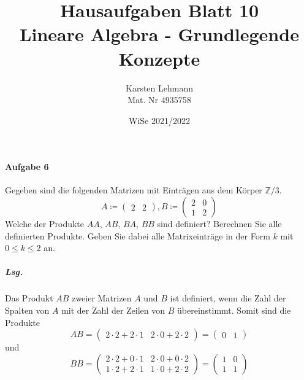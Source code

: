 \documentclass{scrreprt}
\author{Karsten Lehmann\\Mat. Nr 4935758}
\date{WiSe 2021/2022}
\title{Hausaufgaben Blatt 10\\Lineare Algebra - Grundlegende Konzepte}
\begin{document}
\paragraph{Aufgabe 6} Gegeben sind die folgenden Matrizen mit Einträgen aus
dem Körper $\mathbb{Z}/3$.
\[
  A \coloneqq \begin{pmatrix} 2 & 2 \end{pmatrix},
  B \coloneqq \begin{pmatrix} 2 & 0 \\ 1 & 2 \end{pmatrix}
\]
Welche der Produkte $AA$, $AB$, $BA$, $BB$ sind definiert?
Berechnen Sie alle definierten Produkte.
Geben Sie dabei alle Matrixeinträge in der Form $k$ mit $0 \leq k \leq 2$ an.

\subparagraph{Lsg.} Das Produkt $AB$ zweier Matrizen $A$ und $B$ ist definiert,
wenn die Zahl der Spalten von $A$ mit der Zahl der Zeilen von $B$ übereinstimmt.
Somit sind die Produkte
\[
  AB = \begin{pmatrix}
    2 \cdot 2 + 2 \cdot 1 & 2 \cdot 0 + 2 \cdot 2
  \end{pmatrix} = \begin{pmatrix} 0 & 1 \end{pmatrix}
\]
und
\[
  BB = \begin{pmatrix}
    2 \cdot 2 + 0 \cdot 1 & 2 \cdot 0 + 0 \cdot 2 \\
    1 \cdot 2 + 2 \cdot 1 & 1 \cdot 0 + 2 \cdot 2
  \end{pmatrix} = \begin{pmatrix} 1 & 0 \\ 1 & 1 \end{pmatrix}
\]
\end{document}
